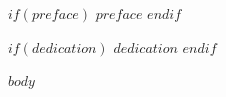 \documentclass[%
    paper=A4,               %
    twoside=true,           %
    openright,              %
    parskip=half,           %
    chapterprefix=true,     %
    11pt,                   %
    headings=normal,        %
    bibliography=totoc,     %
    listof=totoc,           %
    titlepage=on,           %
    captions=tableabove,    %
    chapterprefix=false,    %
    appendixprefix=false,   %
    draft=false,            %
]{scrreprt}%
\begin{document}
$if(preface)$
  \label{sec:preface}
  $preface$
  \cleardoublepage
$endif$

$if(dedication)$
  \label{sec:dedication}
  $dedication$
  \cleardoublepage
$endif$

\begingroup
\hypersetup{linkcolor=black}
\makeatletter
\def\toclevel@chapter{1}
\makeatother
{}
\setcounter{tocdepth}{2}		%
  \tableofcontents				%
  \listoffigures
  \listoftables
\makeatletter
\def\toclevel@chapter{0}
\makeatother
\endgroup
\cleardoublepage

\setcounter{page}{1}			%
\pagestyle{scrheadings}			%

$body$

%
\cleardoublepage

\newpage
\mbox{}

\end{document}
